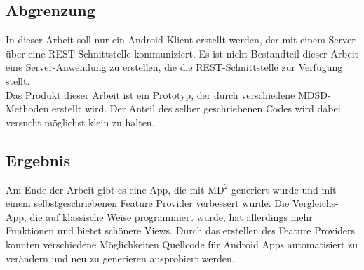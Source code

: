 	\subsection{Abgrenzung}
	In dieser Arbeit soll nur ein Android-Klient erstellt werden, der mit einem Server \"uber eine REST-Schnittstelle kommuniziert. Es ist nicht Bestandteil dieser Arbeit eine Server-Anwendung zu erstellen, die die REST-Schnittstelle zur Verf\"ugung stellt.\\
	Das Produkt dieser Arbeit ist ein Prototyp, der durch verschiedene MDSD-Methoden erstellt wird. Der Anteil des selber geschriebenen Codes wird dabei versucht m\"oglichst klein zu halten.
	
	\subsection{Ergebnis}
	Am Ende der Arbeit gibt es eine App, die mit $\text{MD}^2$ generiert wurde und mit einem selbstgeschriebenen Feature Provider verbessert wurde. Die Vergleichs-App, die auf klassische Weise programmiert wurde, hat allerdings mehr Funktionen und bietet sch\"onere Views. Durch das erstellen des Feature Providers konnten verschiedene M\"oglichkeiten Quellcode f\"ur Android Apps automatisiert zu ver\"andern und neu zu generieren ausprobiert werden.